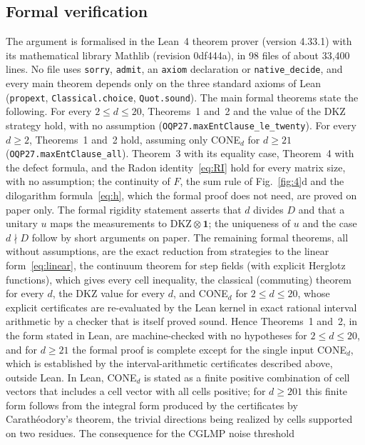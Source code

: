 \documentclass[11pt]{article}
\newcommand{\one}{\mathbf{1}}
\begin{document}
\subsection*{Formal verification}
The argument is formalised in the Lean~4 theorem prover (version 4.33.1) with its mathematical library Mathlib
(revision 0df444a)\cite{Lean2021,Mathlib2020}, in 98 files of about 33,400 lines. No file uses \texttt{sorry},
\texttt{admit}, an \texttt{axiom} declaration or \texttt{native\_decide}, and every main theorem depends only on the
three standard axioms of Lean (\texttt{propext}, \texttt{Classical.choice}, \texttt{Quot.sound}). The main formal
theorems state the following. For every $2\le d\le20$, Theorems~1 and~2 and the value of the DKZ strategy hold, with no
assumption (\nolinkurl{OQP27.maxEntClause_le_twenty}). For every $d\ge2$, Theorems~1 and~2 hold, assuming only
CONE$_d$ for $d\ge21$ (\nolinkurl{OQP27.maxEntClause_all}). Theorem~3 with its equality
case, Theorem~4 with the defect formula, and the Radon identity~\eqref{eq:RI} hold for every matrix size, with no
assumption; the continuity of $F$, the sum rule of Fig.~\ref{fig:4}d and the dilogarithm formula~\eqref{eq:h}, which the
formal proof does not need, are proved on paper only. The formal rigidity statement asserts that $d$ divides $D$ and that
a unitary $u$ maps the measurements to $\mathrm{DKZ}\otimes\one$; the uniqueness of $u$ and the case $d\nmid D$ follow by
short arguments on paper. The remaining
formal theorems, all without assumptions, are the exact reduction from strategies to the linear
form~\eqref{eq:linear}, the continuum theorem for step fields (with explicit Herglotz functions), which gives every cell
inequality, the classical (commuting) theorem for every $d$, the DKZ value for every $d$, and CONE$_d$ for
$2\le d\le20$, whose explicit certificates are re-evaluated by the Lean kernel in exact rational interval arithmetic by
a checker that is itself proved sound. Hence Theorems~1 and~2, in the form stated in Lean, are machine-checked with no
hypotheses for $2\le d\le20$, and for $d\ge21$ the formal proof is complete except for the single input CONE$_d$,
which is established by the interval-arithmetic certificates described above, outside Lean. In Lean, CONE$_d$ is stated
as a finite positive combination of cell vectors that includes a cell vector with all cells positive; for $d\ge201$ this
finite form follows from the integral form produced by the certificates by Carath\'eodory's theorem, the trivial
directions being realized by cells supported on two residues. The consequence for the CGLMP noise threshold
\end{document}
